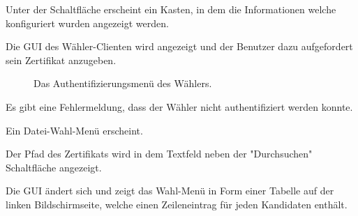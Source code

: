 \documentclass[parskip=full]{scrartcl}
\begin{document}
		{Unter der Schaltfläche erscheint ein Kasten, in dem die Informationen welche konfiguriert wurden angezeigt werden.}

		{Die GUI des Wähler-Clienten wird angezeigt und der Benutzer dazu aufgefordert sein Zertifikat anzugeben.}

\begin{figure}[h!]
	\caption{\label{fig:vot_authentication}
		Das Authentifizierungsmenü des Wählers.
	}
\end{figure}

		{Es gibt eine Fehlermeldung, dass der Wähler nicht authentifiziert werden konnte.}

		{Ein Datei-Wahl-Menü erscheint.}
	
		{Der Pfad des Zertifikats wird in dem Textfeld neben der "Durchsuchen" Schaltfläche angezeigt.}
		
		{Die GUI ändert sich und zeigt das Wahl-Menü in Form einer Tabelle auf der linken Bildschirmseite, welche einen Zeileneintrag für jeden Kandidaten enthält.}
		
\end{document}
